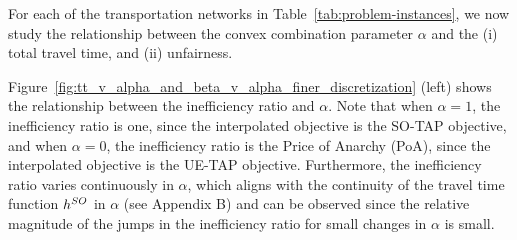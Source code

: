 \documentclass{article}
\newif\ifarxiv   %
\begin{document}
 For each of the transportation networks in Table~\ref{tab:problem-instances}, we now study the relationship between the convex combination parameter $\alpha$ and the (i) total travel time, and (ii) unfairness. \ifarxiv To review these relationships, we consider $\alpha$ to lie in the set $\A_s$ with $s = 0.01$ increments. \fi


Figure~\ref{fig:tt_v_alpha_and_beta_v_alpha_finer_discretization} (left) shows the relationship between the inefficiency ratio and %
$\alpha$. Note that when $\alpha = 1$, the inefficiency ratio is one, since the interpolated objective is the SO-TAP objective, and when $\alpha = 0$, the inefficiency ratio is the Price of Anarchy (PoA), since the interpolated objective is the UE-TAP objective. 
\ifarxiv  As shown on the left in Figure~\ref{fig:tt_v_alpha_and_beta_v_alpha_finer_discretization}, the inefficiency ratio is always between one and the PoA for each of the transportation networks, which corroborates the bound on the total travel time for any convex combination parameter, as obtained in Theorem~\ref{thm:eff-upper-bound}. Furthermore, the inefficiency ratio varies continuously in %
$\alpha$, which further aligns with the continuity of the total travel time function $\objso$ in $\alpha$, as is characterized in Section~\ref{sec:solution-properties}. The jumps in the inefficiency ratio that can be observed for certain values of $\alpha$ %
for Sioux Falls aligns with the continuity result since the relative magnitude of the jumps is small. In particular, the change in the total travel time is less than 2\% for a 1\% change in the value of $\alpha$.
\else %
Furthermore, the inefficiency ratio varies continuously in $\alpha$, which aligns with the continuity of the travel time function $\objso$ in $\alpha$ (see Appendix B) and can be observed since the relative magnitude of the jumps in the inefficiency ratio for small changes in $\alpha$ is small.
\fi    %
\end{document}
